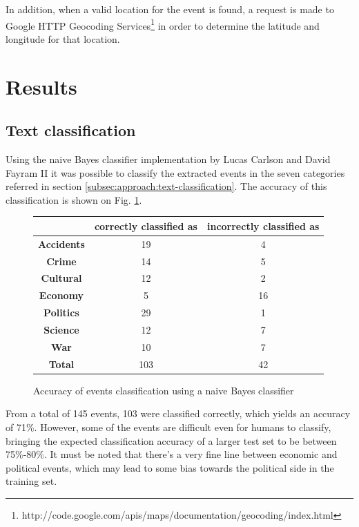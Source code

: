 \documentclass{llncs}
\begin{document}
In addition, when a valid location for the event is found, a request is made to Google HTTP Geocoding Services\footnote{http://code.google.com/apis/maps/documentation/geocoding/index.html} in order to determine the latitude and longitude for that location.

\section{Results}

\subsection{Text classification}

Using the naive Bayes classifier implementation by Lucas Carlson and David Fayram II\cite{classifier} it was possible to classify the extracted events in the seven categories referred in section \ref{subsec:approach:text-classification}. The accuracy of this classification is shown on Fig. \ref{fig:classifier-accuracy}.

\begin{figure}[h!]
	\centering
	\begin{tabular}{c|c|c}
		 & \textbf{correctly classified as} & \textbf{incorrectly classified as} \\
		\hline
		\textbf{Accidents} & 19 & 4 \\
		\textbf{Crime}     & 14 & 5 \\
		\textbf{Cultural}  & 12 & 2 \\
		\textbf{Economy}   & 5 & 16 \\
		\textbf{Politics}  & 29 & 1 \\
		\textbf{Science}   & 12 & 7 \\
		\textbf{War}       & 10 & 7 \\
		\hline
		\textbf{Total}     & 103 & 42 \\
	\end{tabular}
	\caption{Accuracy of events classification using a naive Bayes classifier}
	\label{fig:classifier-accuracy}
\end{figure}

From a total of 145 events, 103 were classified correctly, which yields an accuracy of 71\%. However, some of the events are difficult even for humans to classify, bringing the expected classification accuracy of a larger test set to be between 75\%-80\%. It must be noted that there's a very fine line between economic and political events, which may lead to some bias towards the political side in the training set.
\end{document}
